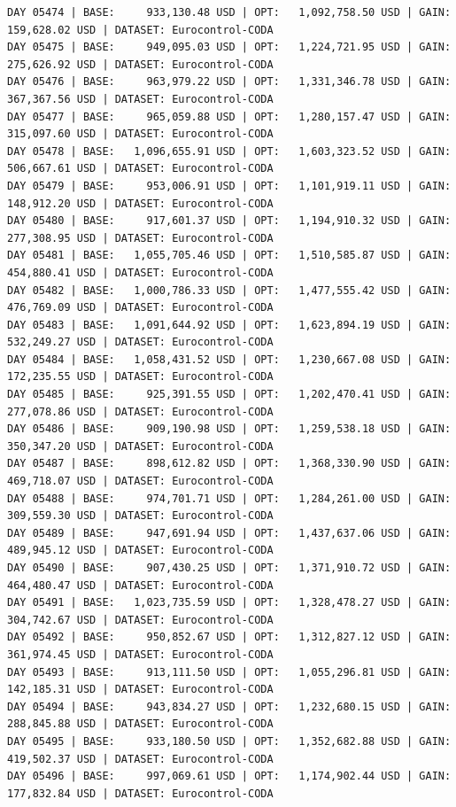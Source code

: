 \documentclass[11pt,a4paper]{article}
\begin{document}
\begin{verbatim}
DAY 05474 | BASE:     933,130.48 USD | OPT:   1,092,758.50 USD | GAIN: 159,628.02 USD | DATASET: Eurocontrol-CODA
DAY 05475 | BASE:     949,095.03 USD | OPT:   1,224,721.95 USD | GAIN: 275,626.92 USD | DATASET: Eurocontrol-CODA
DAY 05476 | BASE:     963,979.22 USD | OPT:   1,331,346.78 USD | GAIN: 367,367.56 USD | DATASET: Eurocontrol-CODA
DAY 05477 | BASE:     965,059.88 USD | OPT:   1,280,157.47 USD | GAIN: 315,097.60 USD | DATASET: Eurocontrol-CODA
DAY 05478 | BASE:   1,096,655.91 USD | OPT:   1,603,323.52 USD | GAIN: 506,667.61 USD | DATASET: Eurocontrol-CODA
DAY 05479 | BASE:     953,006.91 USD | OPT:   1,101,919.11 USD | GAIN: 148,912.20 USD | DATASET: Eurocontrol-CODA
DAY 05480 | BASE:     917,601.37 USD | OPT:   1,194,910.32 USD | GAIN: 277,308.95 USD | DATASET: Eurocontrol-CODA
DAY 05481 | BASE:   1,055,705.46 USD | OPT:   1,510,585.87 USD | GAIN: 454,880.41 USD | DATASET: Eurocontrol-CODA
DAY 05482 | BASE:   1,000,786.33 USD | OPT:   1,477,555.42 USD | GAIN: 476,769.09 USD | DATASET: Eurocontrol-CODA
DAY 05483 | BASE:   1,091,644.92 USD | OPT:   1,623,894.19 USD | GAIN: 532,249.27 USD | DATASET: Eurocontrol-CODA
DAY 05484 | BASE:   1,058,431.52 USD | OPT:   1,230,667.08 USD | GAIN: 172,235.55 USD | DATASET: Eurocontrol-CODA
DAY 05485 | BASE:     925,391.55 USD | OPT:   1,202,470.41 USD | GAIN: 277,078.86 USD | DATASET: Eurocontrol-CODA
DAY 05486 | BASE:     909,190.98 USD | OPT:   1,259,538.18 USD | GAIN: 350,347.20 USD | DATASET: Eurocontrol-CODA
DAY 05487 | BASE:     898,612.82 USD | OPT:   1,368,330.90 USD | GAIN: 469,718.07 USD | DATASET: Eurocontrol-CODA
DAY 05488 | BASE:     974,701.71 USD | OPT:   1,284,261.00 USD | GAIN: 309,559.30 USD | DATASET: Eurocontrol-CODA
DAY 05489 | BASE:     947,691.94 USD | OPT:   1,437,637.06 USD | GAIN: 489,945.12 USD | DATASET: Eurocontrol-CODA
DAY 05490 | BASE:     907,430.25 USD | OPT:   1,371,910.72 USD | GAIN: 464,480.47 USD | DATASET: Eurocontrol-CODA
DAY 05491 | BASE:   1,023,735.59 USD | OPT:   1,328,478.27 USD | GAIN: 304,742.67 USD | DATASET: Eurocontrol-CODA
DAY 05492 | BASE:     950,852.67 USD | OPT:   1,312,827.12 USD | GAIN: 361,974.45 USD | DATASET: Eurocontrol-CODA
DAY 05493 | BASE:     913,111.50 USD | OPT:   1,055,296.81 USD | GAIN: 142,185.31 USD | DATASET: Eurocontrol-CODA
DAY 05494 | BASE:     943,834.27 USD | OPT:   1,232,680.15 USD | GAIN: 288,845.88 USD | DATASET: Eurocontrol-CODA
DAY 05495 | BASE:     933,180.50 USD | OPT:   1,352,682.88 USD | GAIN: 419,502.37 USD | DATASET: Eurocontrol-CODA
DAY 05496 | BASE:     997,069.61 USD | OPT:   1,174,902.44 USD | GAIN: 177,832.84 USD | DATASET: Eurocontrol-CODA

\end{verbatim}
\end{document}
